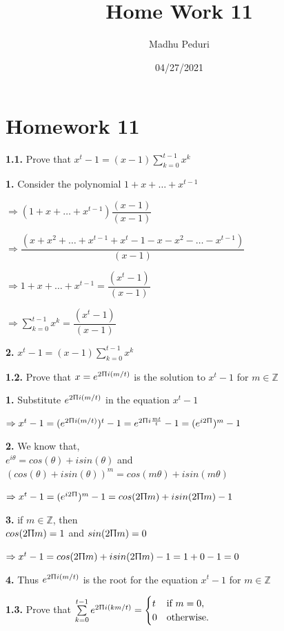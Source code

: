 \documentclass [12pt]{article}
\title{Home Work 11}
\author{Madhu Peduri}
\date{04/27/2021}
\theoremstyle{definition}
\newcommand{\suml}[2]{\sum\limits_{#1}^{#2}}
\begin{document}
\section*{Homework 11}

{\bf 1.1.} Prove that $x^{t} -1 = (x-1)\suml{k=0}{t-1} x^{k}$

\phantom{1em} {\bf 1.} Consider the polynomial $1 + x + \dots + x^{t-1}$

\phantom{1000em} $\Rightarrow (1 + x + \dots + x^{t-1}) \dfrac{(x-1)}{(x-1)}$

\phantom{1000em} $\Rightarrow \dfrac{(x + x^{2} + \dots + x^{t-1} + x^{t} - 1 - x - x^{2} - \dots - x^{t-1})}{(x-1)}$

\phantom{1000em} $\Rightarrow 1 + x + \dots + x^{t-1} = \dfrac{(x^{t} -1)}{(x-1)}$

\phantom{1000em} $\Rightarrow \suml{k=0}{t-1} x^{k} = \dfrac{(x^{t} -1)}{(x-1)}$

\phantom{1em} {\bf 2.} $x^{t} -1 = (x-1)\suml{k=0}{t-1} x^{k}$

{\bf 1.2.} Prove that $x=e^{2\Uppi i(m/t)}$ is the solution to $x^{t} - 1$ for $m \in \mathds{Z}$

\phantom{1em} {\bf 1.} Substitute $e^{2\Uppi i(m/t)}$ in the equation $x^{t} - 1$

\phantom{1000em} $\Rightarrow x^{t} - 1 = (e^{2\Uppi i(m/t)})^{t} - 1 = e^{2\Uppi i \frac{mt}{t}} - 1 = (e^{i2 \Uppi})^{m} - 1$

\phantom{1em} {\bf 2.} We know that,\\
\phantom{1000em} $e^{i\theta} = cos(\theta) + isin(\theta)$ and \\
\phantom{1000em} $(cos(\theta) + isin(\theta))^{m} = cos(m\theta) + isin(m\theta)$

\phantom{1000em} $\Rightarrow x^{t} - 1 = (e^{i2 \Uppi})^{m} - 1 = cos(2 \Uppi m) + isin(2 \Uppi m) - 1$

\phantom{1em} {\bf 3.} if $m \in \mathds{Z}$, then \\
\phantom{1000em} $cos(2 \Uppi m) = 1$ and $sin(2 \Uppi m) = 0$

\phantom{1000em} $\Rightarrow x^{t} - 1 = cos(2 \Uppi m) + isin(2 \Uppi m) - 1 = 1 + 0 - 1 = 0$

\phantom{1em} {\bf 4.} Thus $e^{2\Uppi i(m/t)}$ is the root for the equation $x^{t} - 1$ for $m \in \mathds{Z}$

\newpage

{\bf 1.3.} Prove that $\suml{k=0}{t-1} e^{2\Uppi i(km/t)} = 
	\begin{cases}
   		t & \text{if } m = 0, \\
     	0 & \text{otherwise}.
    \end{cases}$
\end{document}
